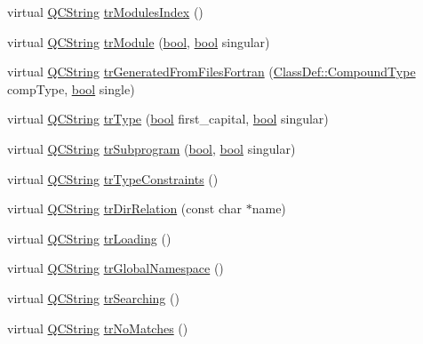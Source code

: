 \begin{DoxyCompactItemize}
\item 
virtual \hyperlink{class_q_c_string}{Q\+C\+String} \hyperlink{class_translator_persian_a01a3063763784bf67b21bad282c8a914}{tr\+Modules\+Index} ()
\item 
virtual \hyperlink{class_q_c_string}{Q\+C\+String} \hyperlink{class_translator_persian_aa2d31e99887be189d227e4c58af3bcae}{tr\+Module} (\hyperlink{qglobal_8h_a1062901a7428fdd9c7f180f5e01ea056}{bool}, \hyperlink{qglobal_8h_a1062901a7428fdd9c7f180f5e01ea056}{bool} singular)
\item 
virtual \hyperlink{class_q_c_string}{Q\+C\+String} \hyperlink{class_translator_persian_a8a2a0f314a7b73aafc6b6b56241bbb89}{tr\+Generated\+From\+Files\+Fortran} (\hyperlink{class_class_def_ae70cf86d35fe954a94c566fbcfc87939}{Class\+Def\+::\+Compound\+Type} comp\+Type, \hyperlink{qglobal_8h_a1062901a7428fdd9c7f180f5e01ea056}{bool} single)
\item 
virtual \hyperlink{class_q_c_string}{Q\+C\+String} \hyperlink{class_translator_persian_ac61885d4032e8e00d3d96037cccc7959}{tr\+Type} (\hyperlink{qglobal_8h_a1062901a7428fdd9c7f180f5e01ea056}{bool} first\+\_\+capital, \hyperlink{qglobal_8h_a1062901a7428fdd9c7f180f5e01ea056}{bool} singular)
\item 
virtual \hyperlink{class_q_c_string}{Q\+C\+String} \hyperlink{class_translator_persian_a22fb6406f917e03dcaf55e86853d51bc}{tr\+Subprogram} (\hyperlink{qglobal_8h_a1062901a7428fdd9c7f180f5e01ea056}{bool}, \hyperlink{qglobal_8h_a1062901a7428fdd9c7f180f5e01ea056}{bool} singular)
\item 
virtual \hyperlink{class_q_c_string}{Q\+C\+String} \hyperlink{class_translator_persian_ad49db74cbe27a29d473ac9bd126b04c0}{tr\+Type\+Constraints} ()
\item 
virtual \hyperlink{class_q_c_string}{Q\+C\+String} \hyperlink{class_translator_persian_aee44dbc70588bd500a54a05834d8abf5}{tr\+Dir\+Relation} (const char $\ast$name)
\item 
virtual \hyperlink{class_q_c_string}{Q\+C\+String} \hyperlink{class_translator_persian_a24ef149e27d80177e7eca6afefa440eb}{tr\+Loading} ()
\item 
virtual \hyperlink{class_q_c_string}{Q\+C\+String} \hyperlink{class_translator_persian_a74d0965e05e6063668a776e2d02bc954}{tr\+Global\+Namespace} ()
\item 
virtual \hyperlink{class_q_c_string}{Q\+C\+String} \hyperlink{class_translator_persian_a86abda5f0e1ef23e5453801b8260223f}{tr\+Searching} ()
\item 
virtual \hyperlink{class_q_c_string}{Q\+C\+String} \hyperlink{class_translator_persian_addaea0e6c495cf11ff8454962e1e8376}{tr\+No\+Matches} ()

\end{DoxyCompactItemize}
